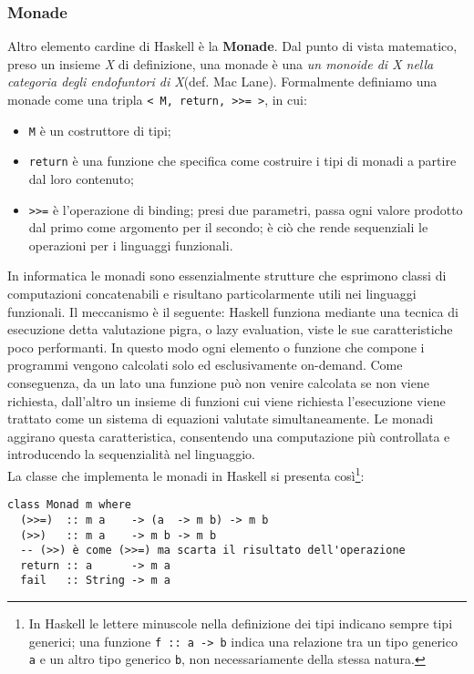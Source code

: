 \subsubsection{Monade}
Altro elemento cardine di Haskell è la \textbf{Monade}. Dal punto di vista matematico, preso un insieme \textit{X} di definizione, una monade è una \textit{un monoide di X nella categoria degli endofuntori di X}(def. Mac Lane\cite{maclane}). Formalmente definiamo una monade come una tripla \texttt{< M, return, >{}>= >}, in cui:
\begin{itemize}
\item{\texttt{M} è un costruttore di tipi;}
\item{\texttt{return} è una funzione che specifica come costruire i tipi di monadi a partire dal loro contenuto;}
\item{\texttt{>{}>=} è l'operazione di binding; presi due parametri, passa ogni valore prodotto dal primo come argomento per il secondo; è ciò che rende sequenziali le operazioni per i linguaggi funzionali.}
\end{itemize}
In informatica le monadi sono essenzialmente strutture che esprimono classi di computazioni concatenabili e risultano particolarmente utili nei linguaggi funzionali. Il meccanismo è il seguente: Haskell funziona mediante una tecnica di esecuzione detta valutazione pigra, o lazy evaluation, viste le sue caratteristiche poco performanti. In questo modo ogni elemento o funzione che compone i programmi vengono calcolati solo ed esclusivamente on-demand. Come conseguenza, da un lato una funzione può non venire calcolata se non viene richiesta, dall'altro un insieme di funzioni cui viene richiesta l'esecuzione viene trattato come un sistema di equazioni valutate simultaneamente. Le monadi aggirano questa caratteristica, consentendo una computazione più controllata e introducendo la sequenzialità nel linguaggio.\\
La classe che implementa le monadi in Haskell si presenta così\footnote{In Haskell le lettere minuscole nella definizione dei tipi indicano sempre tipi generici; una funzione \texttt{f :: a -> b} indica una relazione tra un tipo generico \texttt{a} e un altro tipo generico \texttt{b}, non necessariamente della stessa natura.}:
\begin{verbatim}
class Monad m where
  (>>=)  :: m a    -> (a  -> m b) -> m b
  (>>)   :: m a    -> m b -> m b            
  -- (>>) è come (>>=) ma scarta il risultato dell'operazione
  return :: a      -> m a
  fail   :: String -> m a
\end{verbatim}
